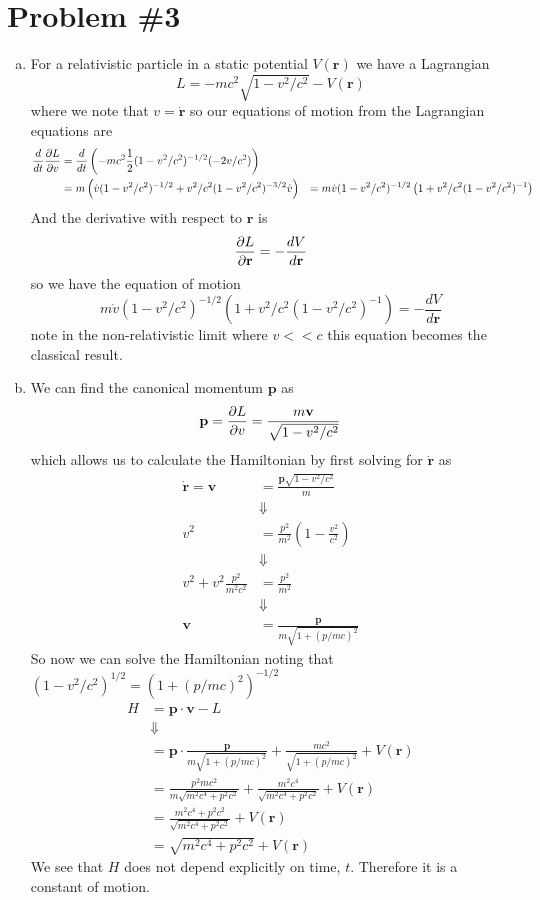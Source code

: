 \documentclass[11pt]{article}
\numberwithin{equation}{section}
\begin{document}
\section{Problem \#3}
\begin{enumerate}[(a)]
\item For a relativistic particle in a static potential $V(\mathbf{r})$ we have a Lagrangian
$$L = -mc^2\sqrt{1-v^2/c^2}-V(\mathbf{r})$$
where we note that $v = \dot{\mathbf{r}}$ so our equations of motion from the Lagrangian equations are
\begin{align*}
\frac{d}{dt}\frac{\partial{L}}{\partial{v}} &= \frac{d}{dt}\left(-mc^2\frac{1}{2}(1-v^2/c^2)^{-1/2}(-2v/c^2)\right) \\
&= m\left(\dot{v}(1-v^2/c^2)^{-1/2} + v^2/c^2(1-v^2/c^2)^{-3/2}\dot{v}\right)
&= m\dot{v}(1-v^2/c^2)^{-1/2}\left(1 + v^2/c^2(1-v^2/c^2)^{-1}\right)
\end{align*}
And the derivative with respect to $\mathbf{r}$ is
$$\frac{\partial{L}}{\partial{\mathbf{r}}} = -\frac{dV}{d\mathbf{r}}$$
so we have the equation of motion 
$$m\dot{v}(1-v^2/c^2)^{-1/2}\left(1 + v^2/c^2(1-v^2/c^2)^{-1}\right) = -\frac{dV}{d\mathbf{r}}$$
note in the non-relativistic limit where $v<<c$ this equation becomes the classical result.

\item
We can find the canonical momentum $\mathbf{p}$ as
$$\mathbf{p} = \frac{\partial{L}}{\partial{v}} = \frac{m\mathbf{v}}{\sqrt{1-v^2/c^2}}$$
which allows us to calculate the Hamiltonian by first solving for $\dot{\mathbf{r}}$ as
\begin{align*}
\dot{\mathbf{r}} = \mathbf{v} &= \frac{\mathbf{p}\sqrt{1-v^2/c^2}}{m}\\
&\Downarrow\\
v^2 &= \frac{p^2}{m^2}\left(1-\frac{v^2}{c^2}\right)\\
&\Downarrow\\
v^2 + v^2\frac{p^2}{m^2c^2}&= \frac{p^2}{m^2}\\
&\Downarrow\\
\mathbf{v} &= \frac{\mathbf{p}}{m\sqrt{1+(p/mc)^2}}
\end{align*}
So now we can solve the Hamiltonian noting that $(1-v^2/c^2)^{1/2} = (1+(p/mc)^2)^{-1/2}$
\begin{align*}
H &= \mathbf{p}\cdot{\mathbf{v}} - L\\
&\Downarrow\\
&= \mathbf{p}\cdot\frac{\mathbf{p}}{m\sqrt{1+(p/mc)^2}} + \frac{mc^2}{\sqrt{1+(p/mc)^2}} + V(\mathbf{r})\\
&= \frac{p^2mc^2}{m\sqrt{m^2c^4+p^2c^2}} + \frac{m^2c^4}{\sqrt{m^2c^4+p^2c^2}} + V(\mathbf{r})\\
&= \frac{m^2c^4+p^2c^2}{\sqrt{m^2c^4+p^2c^2}}+ V(\mathbf{r})\\
&= \sqrt{m^2c^4+p^2c^2} + V(\mathbf{r})
\end{align*}
We see that $H$ does not depend explicitly on time, $t$. Therefore it is a constant of motion.


\end{enumerate}
\end{document}
